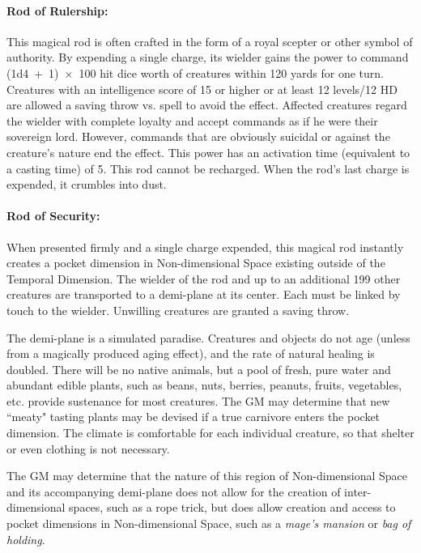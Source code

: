\begin{multicols}{2}
\paragraph{Rod of Rulership:} This magical rod is often crafted in the form of a royal scepter or other symbol of authority.  By expending a single charge, its wielder gains the power to command (1d4~+~1)~$\times$~100 hit dice worth of creatures within 120 yards for one turn.  Creatures with an intelligence score of 15 or higher or at least 12 levels/12 HD are allowed a saving throw vs. spell to avoid the effect.  Affected creatures regard the wielder with complete loyalty and accept commands as if he were their sovereign lord.  However, commands that are obviously suicidal or against the creature's nature end the effect.  This power has an activation time (equivalent to a casting time) of 5.  This rod cannot be recharged.  When the rod's last charge is expended, it crumbles into dust.

\paragraph{Rod of Security:} When presented firmly and a single charge expended, this magical rod instantly creates a pocket dimension in Non-dimensional Space existing outside of the Temporal Dimension.  The wielder of the rod and up to an additional 199 other creatures are transported to a demi-plane at its center.  Each must be linked by touch to the wielder.  Unwilling creatures are granted a saving throw.  

The demi-plane is a simulated paradise.  Creatures and objects do not age (unless from a magically produced aging effect), and the rate of natural healing is doubled.  There will be no native animals, but a pool of fresh, pure water and abundant edible plants, such as beans, nuts, berries, peanuts, fruits, vegetables, etc. provide sustenance for most creatures.  The GM may determine that new ``meaty" tasting plants may be devised if a true carnivore enters the pocket dimension.  The climate is comfortable for each individual creature, so that shelter or even clothing is not necessary.

The GM may determine that the nature of this region of Non-dimensional Space and its accompanying demi-plane does not allow for the creation of inter-dimensional spaces, such as a rope trick, but does allow creation and access to pocket dimensions in Non-dimensional Space, such as a \textit{mage's mansion} or \textit{bag of holding}. 


\end{multicols}
